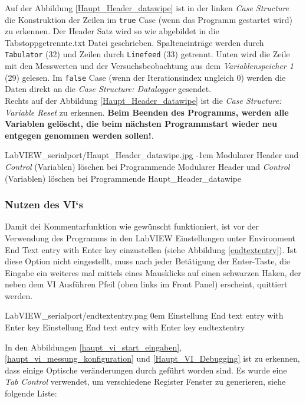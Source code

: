 Auf der Abbildung \ref{Haupt_Header_datawipe} ist in der linken \textit{Case Structure} die Konstruktion der Zeilen im \texttt{true} Case (wenn das Programm gestartet wird) zu erkennen. Der Header Satz wird so wie abgebildet in die Tabstoppgetrennte.txt Datei geschrieben. Spalteneinträge werden durch \texttt{Tabulator} (32) und Zeilen durch \texttt{Linefeed} (33) getrennt. Unten wird die Zeile mit den Messwerten und der Versuchsbeobachtung aus dem \textit{Variablenspeicher 1} (29) gelesen. Im \texttt{false} Case (wenn der Iterationsindex ungleich 0) werden die Daten direkt an die \textit{Case Structure: Datalogger} gesendet.\\

Rechts auf der Abbildung \ref{Haupt_Header_datawipe} ist die \textit{Case Structure: Variable Reset} zu erkennen. \textbf{Beim Beenden des Programms, werden alle Variablen gelöscht, die beim nächsten Programmstart wieder neu entgegen genommen werden sollen!}.
   
{LabVIEW_serialport/Haupt_Header_datawipe.jpg}
{-1em}
{Modularer Header und \textit{Control} (Variablen) löschen bei Programmende}
{Modularer Header und \textit{Control} (Variablen) löschen bei Programmende}
{Haupt_Header_datawipe}


\subsubsection{Nutzen des VI`s}
\label{sec:Haupt_VI_Nutzung}

Damit dei Kommentarfunktion wie gewünscht funktioniert, ist vor der Verwendung des Programms in den LabVIEW Einstellungen unter Environment \glqq End Text entry with Enter key\grqq{} einzustellen (siehe Abbildung \ref{endtextentry}). Ist diese Option nicht eingestellt, muss nach jeder Betätigung der Enter-Taste, die Eingabe ein weiteres mal mittels eines Mausklicks auf einen schwarzen Haken, der neben dem VI Ausführen Pfeil (oben links im Front Panel) erscheint, quittiert werden.

{LabVIEW_serialport/endtextentry.png}
{0em}
{Einstellung \glqq End text entry with Enter key\grqq{}}
{Einstellung \glqq End text entry with Enter key\grqq{}}
{endtextentry}

In den Abbildungen \ref{haupt_vi_start_eingaben}, \ref{haupt_vi_messung_konfiguration} und \ref{Haupt_VI_Debugging} ist zu erkennen, dass einige Optische veränderungen durch geführt worden sind. Es wurde eine \textit{Tab Control} verwendet, um verschiedene Register Fenster zu generieren, siehe folgende Liste:

